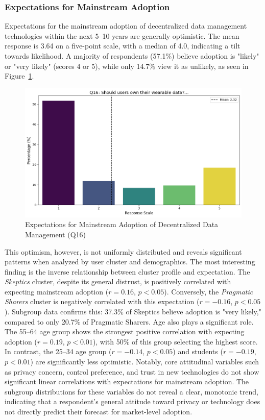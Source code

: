 	\subsubsection{Expectations for Mainstream Adoption}
		Expectations for the mainstream adoption of decentralized data management technologies within the next 5–10 years are generally optimistic. The mean response is 3.64 on a five-point scale, with a median of 4.0, indicating a tilt towards likelihood. A majority of respondents (57.1\%) believe adoption is "likely" or "very likely" (scores 4 or 5), while only 14.7\% view it as unlikely, as seen in Figure~\ref{fig:mainstream_adoption_expectation}. 
		\begin{figure}[ht]\centering
			\includegraphics[width=0.7\linewidth]{figures/questions/Q16_likert.png}
			\caption{Expectations for Mainstream Adoption of Decentralized Data Management (Q16)}
			\label{fig:mainstream_adoption_expectation}
		\end{figure}
		This optimism, however, is not uniformly distributed and reveals significant patterns when analyzed by user cluster and demographics. The most interesting finding is the inverse relationship between cluster profile and expectation. The \textit{Skeptics} cluster, despite its general distrust, is positively correlated with expecting mainstream adoption ($r = 0.16$, $p < 0.05$). Conversely, the \textit{Pragmatic Sharers} cluster is negatively correlated with this expectation ($r = -0.16$, $p < 0.05$). Subgroup data confirms this: 37.3\% of Skeptics believe adoption is "very likely," compared to only 20.7\% of Pragmatic Sharers.
		Age also plays a significant role. The 55--64 age group shows the strongest positive correlation with expecting adoption ($r = 0.19$, $p < 0.01$), with 50\% of this group selecting the highest score. In contrast, the 25--34 age group ($r = -0.14$, $p < 0.05$) and students ($r = -0.19$, $p < 0.01$) are significantly less optimistic.
		Notably, core attitudinal variables such as privacy concern, control preference, and trust in new technologies do not show significant linear correlations with expectations for mainstream adoption. The subgroup distributions for these variables do not reveal a clear, monotonic trend, indicating that a respondent's general attitude toward privacy or technology does not directly predict their forecast for market-level adoption.
